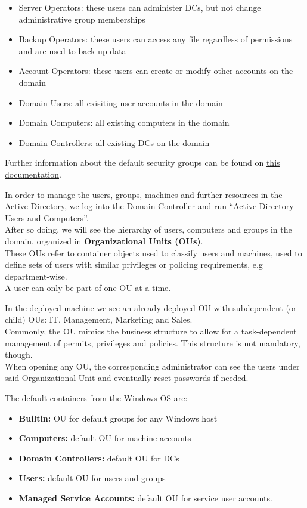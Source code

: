 {\begin{itemize}
\begin{itemize}
\item Server Operators: these users can administer DCs, but not change administrative group memberships
\item Backup Operators: these users can access any file regardless of permissions and are used to back up data
\item Account Operators: these users can create or modify other accounts on the domain
\item Domain Users: all exisiting user accounts in the domain
\item Domain Computers: all existing computers in the domain
\item Domain Controllers: all existing DCs on the domain
\end{itemize}
Further information about the default security groups can be found on \href{https://docs.microsoft.com/en-us/windows/security/identity-protection/access-control/active-directory-security-groups}{this documentation}.
\end{itemize}

In order to manage the users, groups, machines and further resources in the Active Directory, we log into the Domain Controller and run ``Active Directory Users and Computers''.\\
After so doing, we will see the hierarchy of users, computers and groups in the domain, organized in \textbf{Organizational Units (OUs)}.\\
These OUs refer to container objects used to classify users and machines, used to define sets of users with similar privileges or policing requirements, e.g department-wise.\\
A user can only be part of one OU at a time.

In the deployed machine we see an already deployed OU with subdependent (or child) OUs: IT, Management, Marketing and Sales. \\
Commonly, the OU mimics the business structure to allow for a task-dependent management of permits, privileges and policies. This structure is not mandatory, though. \\
When opening any OU, the corresponding administrator can see the users under said Organizational Unit and eventually reset passwords if needed.

The default containers from the Windows OS are:
\begin{itemize}
\item \textbf{Builtin:} OU for default groups for any Windows host
\item \textbf{Computers:} default OU for machine accounts
\item \textbf{Domain Controllers:} default OU for DCs
\item \textbf{Users:} default OU for users and groups
\item \textbf{Managed Service Accounts:} default OU for service user accounts. 
\end{itemize}

}
